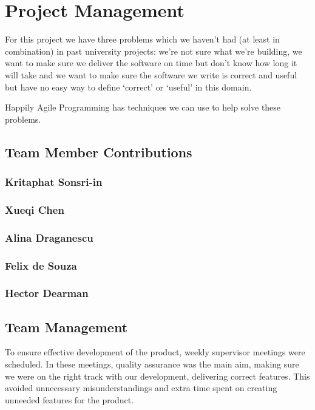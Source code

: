 \documentclass[11pt, a4paper]{article}
\begin{document}
\section{Project Management}
For this project we have three problems which we haven't had (at least in combination) in past university projects: we're not sure what we're building, we want to make sure we deliver the software on time but don't know how long it will take and
we want to make sure the software we write is correct and useful but have no easy way to define `correct' or `useful' in this domain.

Happily Agile Programming has techniques we can use to help solve these problems.
\subsection{Team Member Contributions}
\subsubsection{Kritaphat Sonsri-in}
\subsubsection{Xueqi Chen}
\subsubsection{Alina Draganescu}
\subsubsection{Felix de Souza}
\subsubsection{Hector Dearman}
\subsection{Team Management}

To ensure effective development of the product, weekly supervisor meetings were scheduled.
In these meetings, quality assurance was the main aim, making sure we were on the right track with our development, delivering correct features. 
This avoided unnecessary misunderstandings and extra time spent on creating unneeded features for the product. 
\end{document}
